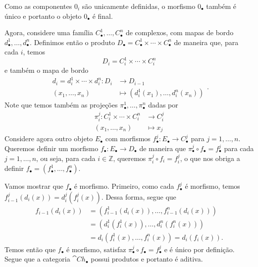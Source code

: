 \begin{demolema}
    \begin{center}
    \end{center}

    Como as componentes $0_i$ são unicamente definidas, o morfismo $0_\bullet$ também é único e portanto o objeto $0_\bullet$ é final.

    Agora, considere uma família $C^1_\bullet, \dots, C^n_\bullet$ de complexos, com mapas de bordo $d_\bullet^1, \dots, d_\bullet^n$. Definimos então o produto $D_\bullet = C^1_\bullet \times \cdots \times C^n_\bullet$ de maneira que, para cada $i$, temos \begin{equation}
        D_i = C^1_i \times \cdots \times C^n_i
    \end{equation} e também o mapa de bordo \begin{equation}
        \begin{split}
            d_i = d^1_i \times \cdots \times d^n_i \colon D_i &\to D_{i - 1} \\ (x_1, \dots, x_n) &\mapsto (d^1_i(x_1), \dots, d^n_i(x_n))
        \end{split}.
    \end{equation} Note que temos também as projeções $\pi^1_\bullet, \dots, \pi^n_\bullet$ dadas por \begin{equation}
        \begin{split}
            \pi^j_i \colon C^1_i \times \cdots \times C^n_i &\to C^j_i \\ (x_1, \dots, x_n) &\mapsto x_j
        \end{split}
    \end{equation} Considere agora outro objeto $E_\bullet$ com morfismos $f^j_\bullet \colon E_\bullet \to C^j_\bullet$ para $j = 1, \dots, n$. Queremos definir um morfismo $f_\bullet \colon E_\bullet \to D_\bullet$ de maneira que $\pi^j_\bullet \circ f_\bullet = f^j_\bullet$ para cada $j = 1, \dots, n$, ou seja, para cada $i \in \mathbb{Z}$, queremos $\pi^j_i \circ f_i = f^j_i$, o que nos obriga a definir $f_\bullet = (f^1_\bullet, \dots, f^n_\bullet)$.
    
    Vamos mostrar que $f_\bullet$ é morfismo. Primeiro, como cada $f^j_\bullet$ é morfismo, temos $f^j_{i - 1}(d_i(x)) = d^j_i(f^j_i(x))$. Dessa forma, segue que \begin{align}
        f_{i - 1}(d_i(x)) &= (f^1_{i-1}(d_i(x)), \dots, f^n_{i - 1}(d_i(x))) \\ &= (d^1_i(f^1_i(x)), \dots, d^n_i(f^n_i(x))) \\ &= d_i(f^1_i(x), \dots, f^n_i(x)) = d_i(f_i(x)).
    \end{align} Temos então que $f_\bullet$ é morfismo, satisfaz $\pi^j_\bullet \circ f_\bullet = f^j_\bullet$ e é único por definição. Segue que a categoria $\cat{Ch}_\bullet$ possui produtos e portanto é aditiva.
\end{demolema}

